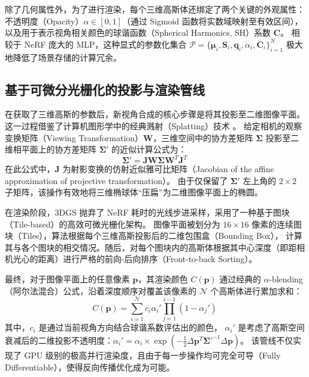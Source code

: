 除了几何属性外，为了进行渲染，每个三维高斯体还绑定了两个关键的外观属性：不透明度（Opacity）$\alpha \in [0,1]$（通过 Sigmoid 函数将实数域映射至有效区间），以及用于表示视角相关颜色的球谐函数（Spherical Harmonics, SH）系数 $\bm{C}$。
相较于 NeRF 庞大的 MLP，这种显式的参数化集合 $\mathcal{P} = \{\bm{\mu}_i, \bm{S}_i, \bm{q}_i, \alpha_i, \bm{C}_i\}_{i=1}^{N}$ 极大地降低了场景存储的计算冗余。

\subsection{基于可微分光栅化的投影与渲染管线}
\label{subsec:differentiable_rasterization}

在获取了三维高斯的参数后，新视角合成的核心步骤是将其投影至二维图像平面。
这一过程借鉴了计算机图形学中的经典溅射（Splatting）技术 \cite{zwicker2001surface}。
给定相机的观察变换矩阵（Viewing Transformation）$\bm{W}$，三维空间中的协方差矩阵 $\bm{\Sigma}$ 投影至二维相平面上的协方差矩阵 $\bm{\Sigma}'$ 的近似计算公式为：
\begin{equation}
    \bm{\Sigma}' = \bm{J} \bm{W} \bm{\Sigma} \bm{W}^T \bm{J}^T
\end{equation}
在此公式中，$\bm{J}$ 为射影变换的仿射近似雅可比矩阵（Jacobian of the affine approximation of projective transformation）。
由于仅保留了 $\bm{\Sigma}'$ 左上角的 $2 \times 2$ 子矩阵，该操作有效地将三维椭球体“压扁”为二维图像平面上的椭圆。

在渲染阶段，3DGS 抛弃了 NeRF 耗时的光线步进采样，采用了一种基于图块（Tile-based）的高效可微光栅化架构。
图像平面被划分为 $16 \times 16$ 像素的连续图块（Tiles），算法根据每个三维高斯投影后的二维包围盒（Bounding Box），
计算其与各个图块的相交情况。随后，对每个图块内的高斯体根据其中心深度（即距相机光心的距离）进行严格的前向-后向排序（Front-to-back Sorting）。

最终，对于图像平面上的任意像素 $\bm{p}$，其渲染颜色 $C(\bm{p})$ 通过经典的 $\alpha$-blending（阿尔法混合）公式，沿着深度顺序对覆盖该像素的 $\mathcal{N}$ 个高斯体进行累加求和：
\begin{equation}
    C(\bm{p}) = \sum_{i=1}^{\mathcal{N}} c_i \alpha_i' \prod_{j=1}^{i-1} (1 - \alpha_j')
\end{equation}
其中，$c_i$ 是通过当前视角方向结合球谐系数评估出的颜色，
$\alpha_i'$ 是考虑了高斯空间衰减后的二维投影不透明度：$\alpha_i' = \alpha_i \times \exp(-\frac{1}{2}\Delta\bm{p}^T \bm{\Sigma}'^{-1} \Delta\bm{p})$。
该管线不仅实现了 GPU 级别的极高并行渲染度，且由于每一步操作均可完全可导（Fully Differentiable），使得反向传播优化成为可能。

